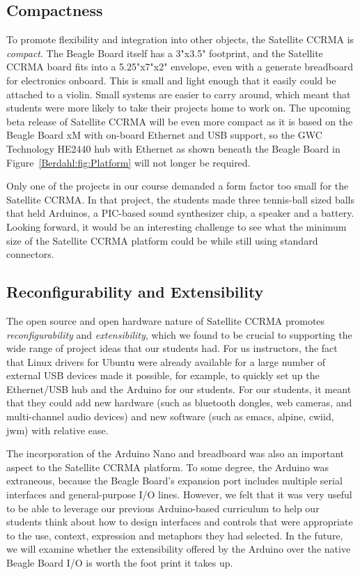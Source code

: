 \subsection{Compactness}
To promote flexibility and integration into other objects, the Satellite CCRMA is \emph{compact}. The Beagle Board itself has a 3"x3.5" footprint, and the Satellite CCRMA board fits into a 5.25"x7"x2" envelope, even with a generate breadboard for electronics onboard. This is small and light enough that it easily could be attached to a violin.  Small systems are easier to carry around, which meant that students were more likely to take their projects home to work on. The upcoming beta release of Satellite CCRMA will be even more compact as it is based on the Beagle Board xM with on-board Ethernet and USB support, so the GWC Technology HE2440 hub with Ethernet as shown beneath the Beagle Board in Figure~\ref{Berdahl:fig:Platform} will not longer be required. 

Only one of the projects in our course demanded a form factor too small for the Satellite CCRMA. In that project, the students made three tennis-ball sized balls that held Arduinos, a PIC-based sound synthesizer chip, a speaker and a battery. Looking forward, it would be an interesting challenge to see what the minimum size of the Satellite CCRMA platform could be while still using standard connectors. 

\subsection{Reconfigurability and Extensibility}
The open source and open hardware nature of Satellite CCRMA promotes \emph{reconfigurability} and \emph{extensibility}, which we found to be crucial to supporting the wide range of project ideas that our students had.  For us instructors, the fact that Linux drivers for Ubuntu were already available for a large number of external USB devices made it possible, for example, to quickly set up the Ethernet/USB hub and the Arduino for our students. For our students, it meant that they could add new hardware (such as bluetooth dongles, web cameras, and multi-channel audio devices) and new software (such as emacs, alpine, cwiid, jwm) with relative ease. 

The incorporation of the Arduino Nano and breadboard was also an important aspect to the Satellite CCRMA platform. To some degree, the Arduino was extraneous, because the Beagle Board's expansion port includes multiple serial interfaces and general-purpose I/O lines. However, we felt that it was very useful to be able to leverage our previous Arduino-based curriculum to help our students think about how to design interfaces and controls that were appropriate to the use, context, expression and metaphors they had selected. In the future, we will examine whether the extensibility offered by the Arduino over the native Beagle Board I/O is worth the foot print it takes up.

